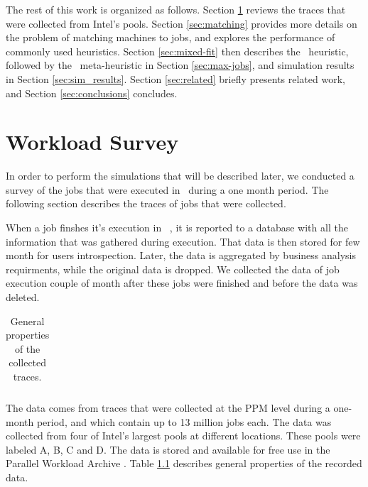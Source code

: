The rest of this work is organized as follows.
Section \ref{sec:traces} reviews the traces that were collected from Intel's pools.
Section \ref{sec:matching} provides more details on the problem of
matching machines to jobs, and explores the performance of commonly
used heuristics.
Section \ref{sec:mixed-fit} then describes the \mif\ heuristic,
followed by the \maj\ meta-heuristic in Section \ref{sec:max-jobs},
and simulation results in Section \ref{sec:sim_results}.
Section \ref{sec:related} briefly presents related work, and Section
\ref{sec:conclusions} concludes.

\chapter{Workload Survey}
\label{sec:traces}
In order to perform the simulations that will be described later, 
we conducted a survey of the jobs that were executed in \nb\ during a one month period.
The following section describes the traces of jobs that were collected.

When a job finshes it's execution in \nb\ , it is reported to a database 
with all the information that was gathered during execution.
That data is then stored for few month for users introspection. Later, the data is 
aggregated by business analysis requirments, while the original data is dropped.
We collected the data of job execution couple of month after these jobs were finished 
and before the data was deleted.

\begin{table}
\begin{tabular}{|c|c|c|c|c|}
\end{tabular}
\caption{General properties of the collected traces.}
\label{tab:jobs_properties}
\end{table}

The data comes from traces that were collected at the PPM
level during a one-month period, and which contain up to 13 million jobs each.
The data was collected from four of Intel's largest pools at different locations. 
These pools were labeled A, B, C and D.
The data is stored and available for free use in the Parallel Workload Archive \cite{parallel13}.
Table \ref{tab:jobs_properties} describes general properties of the recorded data.


